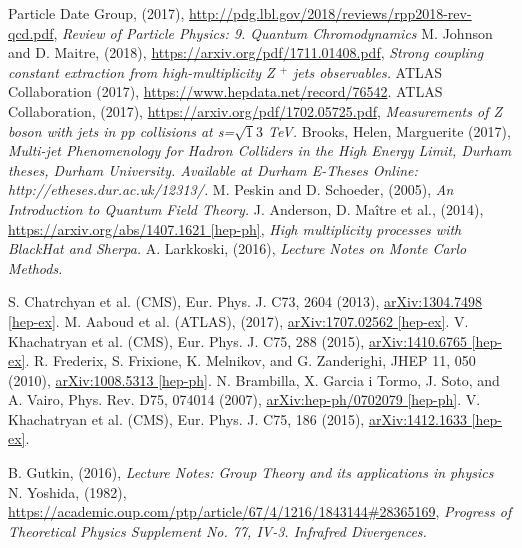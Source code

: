 \documentclass[12pt, onecolumn]{revtex4}    %
\begin{document}
\begin{thebibliography}{99}
 Particle Date Group, (2017), \url{http://pdg.lbl.gov/2018/reviews/rpp2018-rev-qcd.pdf}, \textit{ Review of Particle Physics: 9. Quantum Chromodynamics}
M. Johnson and D. Maitre, (2018), \url{https://arxiv.org/pdf/1711.01408.pdf}, \textit{Strong coupling constant extraction from high-multiplicity Z ${^+}$ jets observables.}
 ATLAS Collaboration (2017), \url{https://www.hepdata.net/record/76542}.
 ATLAS Collaboration, (2017), \url{https://arxiv.org/pdf/1702.05725.pdf}, \textit{Measurements of Z boson with jets in pp collisions at s=${\sqrt 13}$ TeV.}
 Brooks, Helen, Marguerite (2017), \textit{Multi-jet Phenomenology for Hadron Colliders in the High Energy Limit, Durham theses, Durham University. Available at Durham E-Theses Online: http://etheses.dur.ac.uk/12313/.}
 M. Peskin and D. Schoeder, (2005), \textit{An Introduction to Quantum Field Theory.}
 J. Anderson, D. Ma\^itre et al., (2014), \url{https://arxiv.org/abs/1407.1621 [hep-ph]}, \textit{High multiplicity processes with BlackHat and Sherpa.}
 A. Larkkoski, (2016), \textit{Lecture Notes on Monte Carlo Methods.}


 S. Chatrchyan et al. (CMS), Eur. Phys. J. C73, 2604 (2013), \url{arXiv:1304.7498 [hep-ex]}.
 M. Aaboud et al. (ATLAS), (2017), \url{arXiv:1707.02562 [hep-ex]}.
 V. Khachatryan et al. (CMS), Eur. Phys. J. C75, 288 (2015), \url{arXiv:1410.6765 [hep-ex]}.
 R. Frederix, S. Frixione, K. Melnikov, and G. Zanderighi, JHEP 11, 050 (2010), \url{arXiv:1008.5313 [hep-ph]}.
 N. Brambilla, X. Garcia i Tormo, J. Soto, and A. Vairo, Phys. Rev. D75, 074014 (2007), \url{arXiv:hep-ph/0702079 [hep-ph]}.
 V. Khachatryan et al. (CMS), Eur. Phys. J. C75, 186 (2015), \url{arXiv:1412.1633 [hep-ex]}.

 B. Gutkin, (2016), \textit{Lecture Notes: Group Theory and its applications in physics}
 N. Yoshida, (1982), \url{https://academic.oup.com/ptp/article/67/4/1216/1843144#28365169}, \textit{Progress of Theoretical Physics Supplement No. 77, IV-3. Infrafred Divergences.}


\end{thebibliography}
\end{document}
